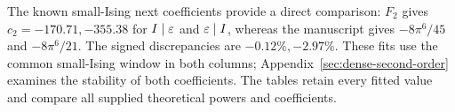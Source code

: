 The known small-Ising next coefficients provide a direct comparison: $F_2$ gives $c_2=-170.71,-355.38$ for $I\mid\varepsilon$ and $\varepsilon\mid I$, whereas the manuscript gives $-8\pi^6/45$ and $-8\pi^6/21$. The signed discrepancies are $-0.12\%,-2.97\%$. These fits use the common small-Ising window in both columns; Appendix~\ref{sec:dense-second-order} examines the stability of both coefficients. The tables retain every fitted value and compare all supplied theoretical powers and coefficients.\par
